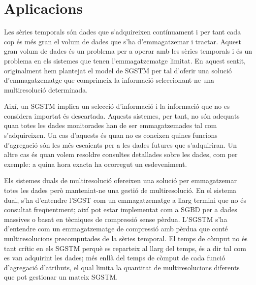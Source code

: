 




\section{Aplicacions}



Les sèries temporals són dades que s'adquireixen contínuament i per
tant cada cop és més gran el volum de dades que s'ha d'emmagatzemar i
tractar. Aquest gran volum de dades és un problema per a operar amb
les sèries temporals i és un problema en els sistemes que tenen
l'emmagatzematge limitat. En aquest sentit, originalment hem
plantejat el model de \gls{SGSTM} per tal d'oferir una solució
d'emmagatzematge que comprimeix la informació seleccionant-ne una
multiresolució determinada.


Així, un \gls{SGSTM} implica un selecció d'informació i la informació
que no es considera importat és descartada. Aquests sistemes, per
tant, no són adequats quan totes les dades monitorades han de ser
emmagatzemades tal com s'adquireixen. Un cas d'aquests és quan no es
coneixen quines funcions d'agregació són les més escaients per a les
dades futures que s'adquiriran. Un altre cas és quan volem resoldre
consultes detallades sobre les dades, com per exemple: a quina hora
exacta ha ocorregut un esdeveniment.


Els sistemes duals de multiresolució ofereixen una solució per
emmagatzemar totes les dades però mantenint-ne una gestió de
multiresolució.  En el sistema dual, s'ha d'entendre l'\gls{SGST} com
un emmagatzematge a llarg termini que no és consultat freqüentment;
així pot estar implementat com a \gls{SGBD} per a dades massives o
basat en tècniques de compressió sense pèrdua. L'\gls{SGSTM} s'ha
d'entendre com un emmagatzematge de compressió amb pèrdua que conté
multiresolucions precomputades de la sèries temporal.  El temps de
còmput no és tant crític en els \gls{SGSTM} perquè es reparteix al
llarg del temps, és a dir tal com es van adquirint les dades; més
enllà del temps de còmput de cada funció d'agregació d'atributs, el
qual limita la quantitat de multiresolucions diferents que pot
gestionar un mateix \gls{SGSTM}.


